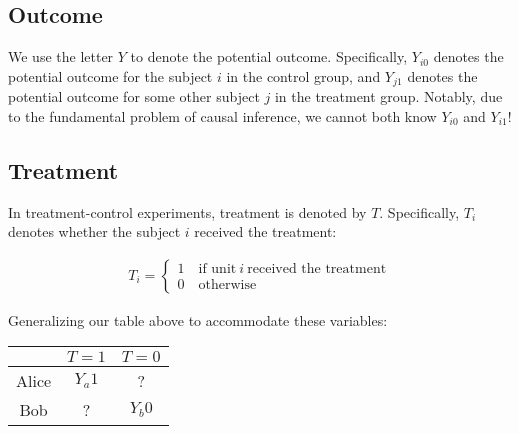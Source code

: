 \documentclass{article}
\begin{document}
\subsection{Outcome}
We use the letter $Y$ to denote the potential outcome.
Specifically, $Y_{i0}$ denotes the potential outcome for the subject $i$ in the control group, and $Y_{j1}$ denotes the potential outcome for some other subject $j$ in the treatment group.
Notably, due to the fundamental problem of causal inference, we cannot both know $Y_{i0}$ and $Y_{i1}$!

\subsection{Treatment}
In treatment-control experiments, treatment is denoted by $T$. 
Specifically, $T_i$ denotes whether the subject $i$ received the treatment:
\begin{center}
    \begin{gather*}
        T_i =  
        \begin{cases}
            1 \quad \text{if unit} \ i \ \text{received the treatment} \\
            0 \quad \text{otherwise}
        \end{cases}
    \end{gather*}
\end{center}
Generalizing our table above to accommodate these variables:
\begin{center}
    \begin{tabular}{|c|c|c|}
         \hline
          & $T = 1$ & $T=0$ \\
         \hline
         Alice & $Y_a1$ & ? \\
         \hline
         Bob & ? & $Y_b0$ \\
         \hline
    \end{tabular}
\end{center}
\end{document}
